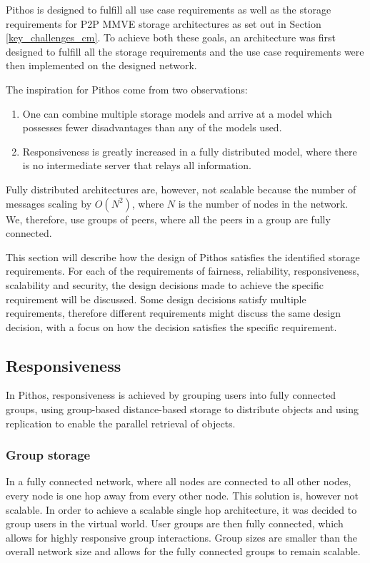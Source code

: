 Pithos is designed to fulfill all use case requirements as well as the storage requirements for P2P MMVE storage architectures as set out in Section \ref{key_challenges_cm}. To achieve both these goals, an architecture was first designed to fulfill all the storage requirements and the use case requirements were then implemented on the designed network.

The inspiration for Pithos come from two observations:
%
\begin{enumerate}
  \item One can combine multiple storage models and arrive at a model which possesses fewer disadvantages than any of the models used.
  \item Responsiveness is greatly increased in a fully distributed model, where there is no intermediate server that relays all information.
\end{enumerate}

Fully distributed architectures are, however, not scalable because the number of messages scaling by $O(N^2)$, where $N$ is the number of nodes in the network. We, therefore, use groups of peers, where all the peers in a group are fully connected.

This section will describe how the design of Pithos satisfies the identified storage requirements. For each of the requirements of fairness, reliability, responsiveness, scalability and security, the design decisions made to achieve the specific requirement will be discussed. Some design decisions satisfy multiple requirements, therefore different requirements might discuss the same design decision, with a focus on how the decision satisfies the specific requirement.

\subsection{Responsiveness}

In Pithos, responsiveness is achieved by grouping users into fully connected groups, using group-based distance-based storage to distribute objects and using replication to enable the parallel retrieval of objects.

\subsubsection{Group storage}

In a fully connected network, where all nodes are connected to all other nodes, every node is one hop away from every other node. This solution is, however not scalable. In order to achieve a scalable single hop architecture, it was decided to group users in the virtual world. User groups are then fully connected, which allows for highly responsive group interactions. Group sizes are smaller than the overall network size and allows for the fully connected groups to remain scalable.

